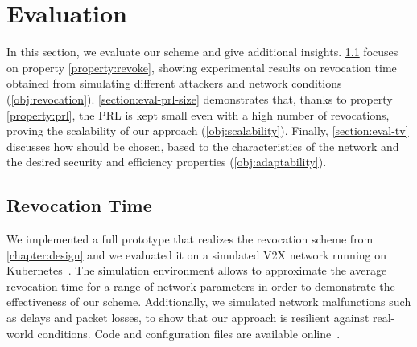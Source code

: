 \section{Evaluation}
\label{chapter:eval}

In this section, we evaluate our scheme and give additional insights.
\cref{section:eval-sim} focuses on property \ref{property:revoke}, showing
experimental results on revocation time obtained from simulating different
attackers and network conditions (\ref{obj:revocation}).
\cref{section:eval-prl-size} demonstrates that, thanks to property
\ref{property:prl}, the \ac{PRL} is kept small even with a high number of
revocations, proving the scalability of our approach (\ref{obj:scalability}).
Finally, \cref{section:eval-tv} discusses how \paramtt{} should be chosen, based
to the characteristics of the network and the desired security and efficiency
properties (\ref{obj:adaptability}).


\subsection{Revocation Time}
\label{section:eval-sim}

We implemented a full prototype that realizes the revocation scheme from
\cref{chapter:design} and we evaluated it on a simulated \ac{V2X} network
running on Kubernetes~\cite{kubernetes}. The simulation environment allows to
approximate the average revocation time for a range of network parameters in
order to demonstrate the effectiveness of our scheme. Additionally, we simulated
network malfunctions such as delays and packet losses, to show that our approach
is resilient against real-world conditions. Code and configuration files are
available online~\cite{supplMaterial}.

